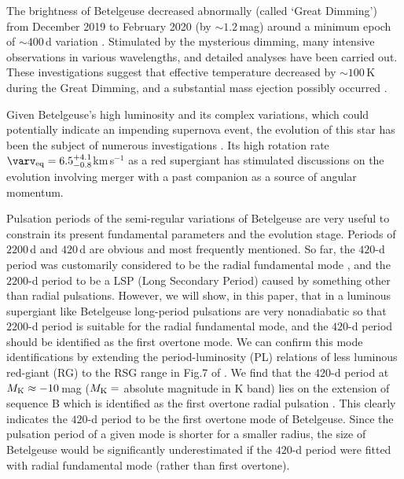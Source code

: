 \documentclass[fleqn,usenatbib]{mnras}
\begin{document}
The brightness of Betelgeuse decreased abnormally (called `Great Dimming') 
from  December 2019 to February 2020 (by $\sim\!1.2$\,mag) 
around a minimum epoch of $\sim400$\,d variation \citep{Guinan2019}.
Stimulated by the mysterious dimming, many intensive observations 
in various wavelengths, and detailed analyses have been carried out. 
These investigations suggest that effective temperature decreased by $\sim100$\,K
\citep[e.g.,][]{Dharmawardena2020,Harper2020,Taniguchi2022,Wasatonic2022,Mittag2023}
during the Great Dimming, and a substantial mass ejection possibly occurred
\citep[e.g.,][]{Montarges2021,Kravchenko2021,Taniguchi2022,Dupree2022,Jadlovsky2023}. 

Given Betelgeuse's high luminosity and its complex variations, 
which could potentially indicate an impending supernova event, the evolution
of this star has been the subject of numerous investigations
 \citep[e.g.,][]{Meynet2013,Dolan2016,Wheeler2017,Nance2018, Luo2022}.
Its high rotation rate $\varv_{\rm eq} = 6.5^{+4.1}_{-0.8}$km\,s$^{-1}$
\citep{Kervella2018} as a red supergiant has stimulated discussions on the evolution
involving merger with a past companion \citep{Sullivan2020} 
as a source of angular momentum. 

Pulsation periods of the semi-regular variations of Betelgeuse are very useful
to constrain its present fundamental parameters and the evolution stage.
Periods of $2200$\,d and $420$\,d are obvious and most frequently mentioned.
So far, the $420$-d period was customarily considered to be the radial 
fundamental mode \citep[e.g.][]{Joyce2020}, and the $2200$-d period to be a LSP (Long Secondary Period)
caused by something other than radial pulsations.
However, we will show, in this paper, that in a luminous supergiant like Betelgeuse
long-period pulsations are very nonadiabatic so that $2200$-d period is
suitable for the radial fundamental mode,
and the $420$-d period should be identified as the first overtone mode. We can confirm this mode identifications by extending the period-luminosity (PL) relations of less luminous red-giant (RG) to the RSG range in Fig.7 of \citet{Kiss2006}
\citep[or Fig.6 of][]{Chatys2019}. We find that the $420$-d period at $M_{\rm K}\approx -10$\,mag ($M_{\rm K}=$ absolute magnitude in K band) lies on the extension of sequence B which is identified as the first overtone radial pulsation \citep[e.g.,][]{Trabucchi2017}. This clearly indicates the $420$-d period to be the first overtone mode of Betelgeuse.  
Since the pulsation period of a given mode is shorter for a smaller radius, 
the size of Betelgeuse would be significantly underestimated if the $420$-d period 
were fitted with radial fundamental mode (rather than first overtone).
\end{document}
